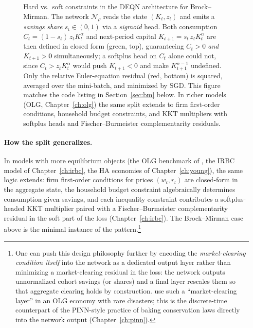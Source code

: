 \documentclass[11pt,a4paper]{report}
\begin{document}
\begin{figure}[ht]
\caption{Hard vs.\ soft constraints in the DEQN architecture for Brock--Mirman.  The network $\mathcal{N}_\rho$ reads the state $(K_t,z_t)$ and emits a \emph{savings share} $s_t \in (0,1)$ via a \emph{sigmoid} head.  Both consumption $C_t = (1-s_t)\,z_t K_t^\alpha$ and next-period capital $K_{t+1} = s_t\,z_t K_t^\alpha$ are then defined in closed form (green, top), guaranteeing $C_t>0$ \emph{and} $K_{t+1}>0$ simultaneously; a softplus head on $C_t$ alone could not, since $C_t > z_t K_t^\alpha$ would push $K_{t+1}<0$ and make $K_{t+1}^{\alpha-1}$ undefined.  Only the relative Euler-equation residual (red, bottom) is squared, averaged over the mini-batch, and minimized by SGD.  This figure matches the code listing in Section~\ref{sec:bm} below.  In richer models (OLG, Chapter~\ref{ch:olg}) the same split extends to firm first-order conditions, household budget constraints, and KKT multipliers with softplus heads and Fischer--Burmeister complementarity residuals.}
\label{fig:hard_soft}
\end{figure}

\paragraph{How the split generalizes.}  In models with more equilibrium objects (the OLG benchmark of \citet{azinovicDEEPEQUILIBRIUMNETS2022}, the IRBC model of Chapter~\ref{ch:irbc}, the HA economies of Chapter~\ref{ch:young}), the same logic extends: firm first-order conditions for prices $(w_t,r_t)$ are closed-form in the aggregate state, the household budget constraint algebraically determines consumption given savings, and each inequality constraint contributes a softplus-headed KKT multiplier paired with a Fischer--Burmeister complementarity residual in the soft part of the loss (Chapter~\ref{ch:irbc}).  The Brock--Mirman case above is the minimal instance of the pattern.\footnote{One can push this design philosophy further by encoding the \emph{market-clearing condition itself} into the network as a dedicated output layer rather than minimizing a market-clearing residual in the loss: the network outputs unnormalized cohort savings (or shares) and a final layer rescales them so that aggregate clearing holds by construction.  \citet{azinoviczemlicka_2024} use such a ``market-clearing layer'' in an OLG economy with rare disasters; this is the discrete-time counterpart of the PINN-style practice of baking conservation laws directly into the network output (Chapter~\ref{ch:pinn}).}
\end{document}
